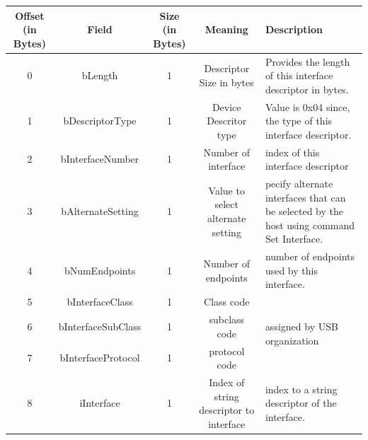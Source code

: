 \documentclass{article}
\begin{document}
\begin{table}[H]
    \centering
    \begin{adjustbox}{max width=\textwidth}
        \begin{tabular}{|c|c|c|c|p{6cm}|}
            \hline
            \textbf{Offset (in Bytes)} & \textbf{Field}     & \textbf{Size (in Bytes)} & \textbf{Meaning}                        & \textbf{Description}                                                                      \\
            \hline
            0                          & bLength            & 1                        & Descriptor Size in bytes                & Provides the length of this interface descriptor in bytes.                                \\
            \hline
            1                          & bDescriptorType    & 1                        & Device Descritor type                   & Value is 0x04 since, the type of this interface descriptor.                               \\
            \hline
            2                          & bInterfaceNumber   & 1                        & Number of interface                     & index of this interface descriptor                                                        \\
            \hline
            3                          & bAlternateSetting  & 1                        & Value to select alternate setting       & pecify alternate interfaces that can be selected by the host using command Set Interface. \\
            \hline
            4                          & bNumEndpoints      & 1                        & Number of endpoints                     & number of endpoints used by this interface.                                               \\
            \hline
            5                          & bInterfaceClass    & 1                        & Class code                              & \multirow{3}{6cm}{assigned by USB organization}                                           \\
            \cline{1-4}
            6                          & bInterfaceSubClass & 1                        & subclass code                           &                                                                                           \\
            \cline{1-4}
            7                          & bInterfaceProtocol & 1                        & protocol code                           &                                                                                           \\
            \hline
            8                          & iInterface         & 1                        & Index of string descriptor to interface & index to a string descriptor of the interface.                                            \\
            \hline
        \end{tabular}
    \end{adjustbox}
\end{table}
\end{document}

